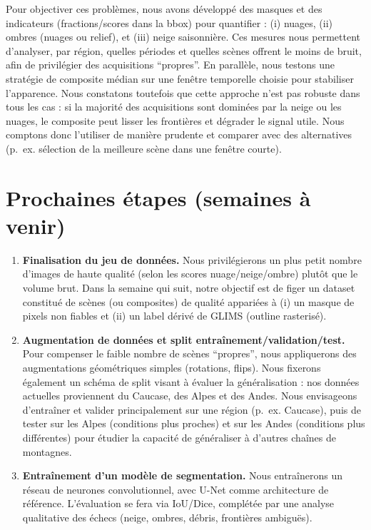 \documentclass[10pt]{article}
\begin{document}
Pour objectiver ces problèmes, nous avons développé des masques et des indicateurs (fractions/scores dans la bbox) pour quantifier : (i) nuages, (ii) ombres (nuages ou relief), et (iii) neige saisonnière. Ces mesures nous permettent d'analyser, par région, quelles périodes et quelles scènes offrent le moins de bruit, afin de privilégier des acquisitions ``propres''. En parallèle, nous testons une stratégie de composite médian sur une fenêtre temporelle choisie pour stabiliser l'apparence. Nous constatons toutefois que cette approche n'est pas robuste dans tous les cas : si la majorité des acquisitions sont dominées par la neige ou les nuages, le composite peut lisser les frontières et dégrader le signal utile. Nous comptons donc l'utiliser de manière prudente et comparer avec des alternatives (p.\ ex. sélection de la meilleure scène dans une fenêtre courte).

\section*{Prochaines étapes (semaines à venir)}
\begin{enumerate}
    \item \textbf{Finalisation du jeu de données.}
    Nous privilégierons un plus petit nombre d'images de haute qualité (selon les scores nuage/neige/ombre) plutôt que le volume brut. Dans la semaine qui suit, notre objectif est de figer un dataset constitué de scènes (ou composites) de qualité appariées à (i) un masque de pixels non fiables et (ii) un label dérivé de GLIMS (outline rasterisé).

    \item \textbf{Augmentation de données et split entraînement/validation/test.}
    Pour compenser le faible nombre de scènes ``propres'', nous appliquerons des augmentations géométriques simples (rotations, flips). Nous fixerons également un schéma de split visant à évaluer la généralisation : nos données actuelles proviennent du Caucase, des Alpes et des Andes. Nous envisageons d'entraîner et valider principalement sur une région (p.\ ex. Caucase), puis de tester sur les Alpes (conditions plus proches) et sur les Andes (conditions plus différentes) pour étudier la capacité de généraliser à d'autres chaînes de montagnes.

    \item \textbf{Entraînement d'un modèle de segmentation.}
    Nous entraînerons un réseau de neurones convolutionnel, avec U-Net comme architecture de référence. L'évaluation se fera via IoU/Dice, complétée par une analyse qualitative des échecs (neige, ombres, débris, frontières ambiguës).
\end{enumerate}
\end{document}
